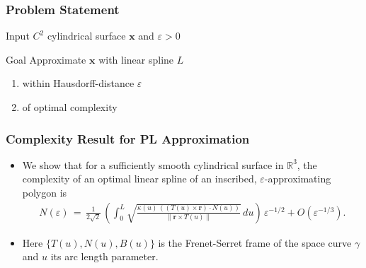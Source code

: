 \documentclass[ucs,9pt,pagenumbersfull]{beamer}
\begin{document}
\begin{frame}
  \frametitle {Problem Statement}
  \begin{block}{Input}
    \(C^2\) cylindrical surface \(\mathbf{x}\) and \(\varepsilon > 0\)
  \end{block}

  \begin{block}{Goal}
    Approximate \(\mathbf{x}\) with linear spline \(L\)
    \begin{enumerate}
    \item within Hausdorff-distance \(\varepsilon\)
    \item of optimal complexity
    \end{enumerate}
  \end{block}
\end{frame}

\begin{frame}
  \frametitle{Complexity Result for PL Approximation}
  \begin{itemize}
  \item We show that for a sufficiently smooth cylindrical surface
    in \(\mathbb{R}^3\), the complexity of an optimal linear spline
    of an inscribed, \(\varepsilon\)-approximating polygon is
    \begin{align*}
      N(\varepsilon) \, = \,
      \frac{1}{2\sqrt{2}}\,\left(\int_0^L\sqrt{\frac{\kappa(u)\,\left(
          (T(u) \times \mathbf{r})\cdot N(u)\right)}{\|\mathbf{r} \times
          T(u)\|}}\,du\right)\,\varepsilon^{-1/2} + O(\varepsilon^{-1/3}).
    \end{align*}
  \item Here \(\{T(u),N(u),B(u)\}\) is the Frenet-Serret frame
    of the space curve \(\gamma\) and \(u\) its arc length parameter.
  \end{itemize}
\end{frame}
\end{document}

